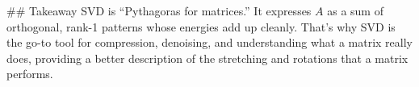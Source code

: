 ## Takeaway
SVD is “Pythagoras for matrices.” It expresses $A$ as a sum of orthogonal, rank-1 patterns whose energies add up cleanly. That’s why SVD is the go-to tool for compression, denoising, and understanding what a matrix really does, providing a better description of the stretching and rotations that a matrix performs.
